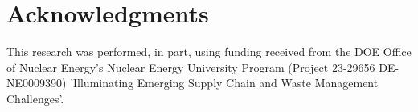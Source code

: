 \documentclass{anstrans}
\begin{document}
\section{Acknowledgments}
This research was performed, in part, using funding received from the DOE
Office of Nuclear Energy's Nuclear Energy University Program (Project 23-29656
DE-NE0009390) 'Illuminating Emerging Supply Chain and Waste Management
Challenges'.



\end{document}
